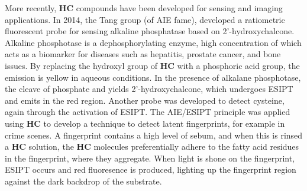 More recently, \textbf{HC} compounds have been developed for sensing and imaging applications. In 2014, the Tang group (of AIE fame), developed a ratiometric fluorescent probe for sensing alkaline phosphatase based on 2'-hydroxychalcone.\cite{Song2014} Alkaline phosphotase is a dephosphorylating  enzyme, high concentration of which acts as a biomarker for diseases such as hepatitis, prostate cancer, and bone issues. By replacing the hydroxyl group of \textbf{HC} with a phosphoric acid group, the emission is yellow in aqueous conditions. In the presence of alkalane phosphotase, the cleave of phosphate and yields 2'-hydroxychalcone, which undergoes ESIPT and emits in the red region. Another probe was developed to detect cysteine, again through the activation of ESIPT.\cite{Li2017a} The AIE/ESIPT principle was applied using \textbf{HC} to develop a technique to detect latent fingerprints, for example in crime scenes.\cite{Jin2015} A fingerprint contains a high level of sebum, and when this is rinsed a \textbf{HC} solution, the \textbf{HC} molecules preferentially adhere to the fatty acid residues in the fingerprint, where they aggregate. When light is shone on the fingerprint, ESIPT occurs and red fluoresence is produced, lighting up the fingerprint region against the dark backdrop of the substrate. 

